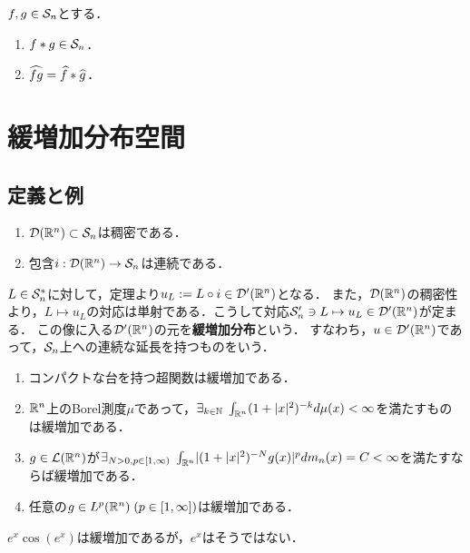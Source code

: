 \documentclass[uplatex,dvipdfmx]{jsreport}
\begin{document}
\begin{theorem}
    $f,g\in\S_n$とする．
    \begin{enumerate}
        \item $f*g\in\S_n$．
        \item $\wh{fg}=\wh{f}*\wh{g}$．
    \end{enumerate}
\end{theorem}

\section{緩増加分布空間}

\subsection{定義と例}

\begin{theorem}\mbox{}
    \begin{enumerate}
        \item $\D(\R^n)\subset\S_n$は稠密である．
        \item 包含$i:\D(\R^n)\to\S_n$は連続である．
    \end{enumerate}
\end{theorem}

\begin{definition}
    $L\in\S_n^*$に対して，定理より$u_L:=L\circ i\in\D'(\R^n)$となる．
    また，$\D(\R^n)$の稠密性より，$L\mapsto u_L$の対応は単射である．こうして対応$\S'_n\ni L\mapsto u_L\in\D'(\R^n)$が定まる．
    この像に入る$\D'(\R^n)$の元を\textbf{緩増加分布}という．
    すなわち，$u\in\D'(\R^n)$であって，$\S_n$上への連続な延長を持つものをいう．
\end{definition}

\begin{example}[任意の可積分関数は緩増加である]\mbox{}
    \begin{enumerate}
        \item コンパクトな台を持つ超関数は緩増加である．
        \item $\R^n$上のBorel測度$\mu$であって，$\exists_{k\in\N}\;\int_{\R^n}(1+\abs{x}^2)^{-k}d\mu(x)<\infty$を満たすものは緩増加である．
        \item $g\in\L(\R^n)$が$\exists_{N>0,p\in[1,\infty)}\;\int_{\R^n}\abs{(1+\abs{x}^2)^{-N}g(x)}^pdm_n(x)=C<\infty$を満たすならば緩増加である．
        \item 任意の$g\in L^p(\R^n)\;(p\in[1,\infty])$は緩増加である．
    \end{enumerate}
    $e^x\cos(e^x)$は緩増加であるが，$e^x$はそうではない．
\end{example}
\end{document}
